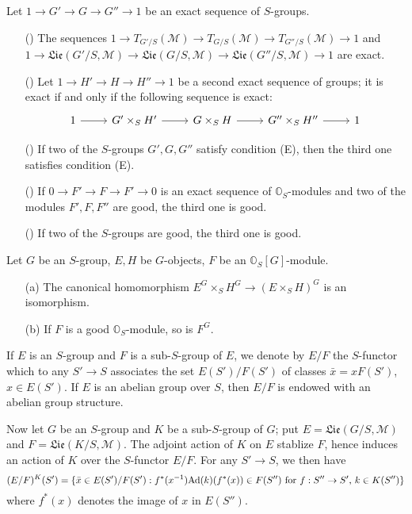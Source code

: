 \begin{lemma}\label{scheme group condition (E) good and exact sequence}
Let $1\to G'\to G\to G''\to 1$ be an exact sequence of $S$-groups.
\begin{enumerate}
    \item[(\rmnum{1})] The sequences $1\to T_{G'/S}(\mathscr{M})\to T_{G/S}(\mathscr{M})\to T_{G''/S}(\mathscr{M})\to 1$ and $1\to\mathfrak{Lie}(G'/S,\mathscr{M})\to \mathfrak{Lie}(G/S,\mathscr{M})\to \mathfrak{Lie}(G''/S,\mathscr{M})\to 1$ are exact.
    \item[(\rmnum{2})] Let $1\to H'\to H\to H''\to 1$ be a second exact sequence of groups; it is exact if and only if the following sequence is exact:
    \[\begin{tikzcd}
    1\ar[r]&G'\times_SH'\ar[r]&G\times_SH\ar[r]&G''\times_SH''\ar[r]&1
    \end{tikzcd}\]
    \item[(\rmnum{3})] If two of the $S$-groups $G',G,G''$ satisfy condition (E), then the third one satisfies condition (E).
    \item[(\rmnum{4})] If $0\to F'\to F\to F'\to 0$ is an exact sequence of $\mathbb{O}_S$-modules and two of the modules $F',F,F''$ are good, the third one is good.
    \item[(\rmnum{5})] If two of the $S$-groups are good, the third one is good.
\end{enumerate}
\end{lemma}

\begin{lemma}\label{scheme O_S-module good and invariant under group}
Let $G$ be an $S$-group, $E,H$ be $G$-objects, $F$ be an $\mathbb{O}_S[G]$-module.
\begin{enumerate}
    \item[(a)] The canonical homomorphism $E^G\times_SH^G\to (E\times_SH)^G$ is an isomorphism.
    \item[(b)] If $F$ is a good $\mathbb{O}_S$-module, so is $F^G$.
\end{enumerate}
\end{lemma}

If $E$ is an $S$-group and $F$ is a sub-$S$-group of $E$, we denote by $E/F$ the $S$-functor which to any $S'\to S$ associates the set $E(S')/F(S')$ of classes $\bar{x}=xF(S')$, $x\in E(S')$. If $E$ is an abelian group over $S$, then $E/F$ is endowed with an abelian group structure.\par
Now let $G$ be an $S$-group and $K$ be a sub-$S$-group of $G$; put $E=\mathfrak{Lie}(G/S,\mathscr{M})$ and $F=\mathfrak{Lie}(K/S,\mathscr{M})$. The adjoint action of $K$ on $E$ stablize $F$, hence induces an action of $K$ over the $S$-functor $E/F$. For any $S'\to S$, we then have
\[(E/F)^K(S')=\{\bar{x}\in E(S')/F(S'):\text{$f^*(x^{-1})\mathrm{Ad}(k)(f^*(x))\in F(S'')$ for $f:S''\to S'$, $k\in K(S'')$}\}\]
where $f^*(x)$ denotes the image of $x$ in $E(S'')$.

